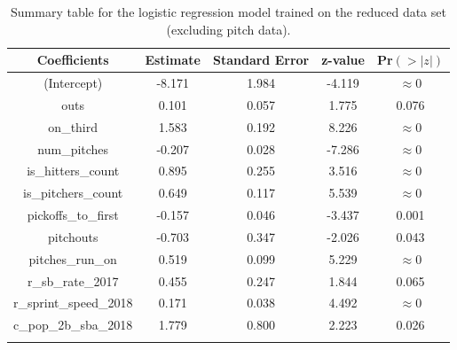 \documentclass{article}
\begin{document}
\begin{longtable}{c c c c c}
    \hline
    Coefficients & Estimate & Standard Error & z-value & Pr$(>|z|)$ \\
    \hline
    (Intercept) & -8.171 & 1.984 & -4.119 & $\approx 0$ \\
    outs & 0.101 & 0.057 & 1.775 & 0.076 \\
    on\_third & 1.583 & 0.192 & 8.226 & $\approx 0$ \\
    num\_pitches & -0.207 & 0.028 & -7.286 & $\approx 0$ \\
    is\_hitters\_count & 0.895 & 0.255 & 3.516 & $\approx 0$ \\
    is\_pitchers\_count & 0.649 & 0.117 & 5.539 & $\approx 0$ \\
    pickoffs\_to\_first & -0.157 & 0.046 & -3.437 & 0.001 \\
    pitchouts & -0.703 & 0.347 & -2.026 & 0.043 \\
    pitches\_run\_on & 0.519 & 0.099 & 5.229 & $\approx 0$ \\
    r\_sb\_rate\_2017 & 0.455 & 0.247 & 1.844 & 0.065 \\
    r\_sprint\_speed\_2018 & 0.171 & 0.038 & 4.492 & $\approx 0$ \\
    c\_pop\_2b\_sba\_2018 & 1.779 & 0.800 & 2.223 & 0.026 \\
    \hline
    \caption{Summary table for the logistic regression model trained on the reduced data set (excluding pitch data).}
    \label{tab4_logistic_summary}
\end{longtable}

\vspace{0.25cm}
\end{document}
